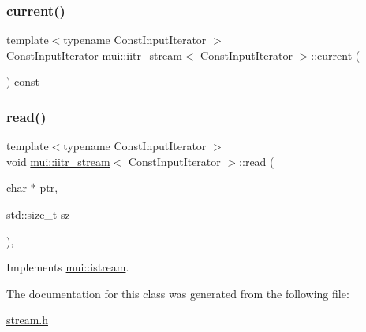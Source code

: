 \subsubsection{\texorpdfstring{current()}{current()}}
{\footnotesize\ttfamily template$<$typename Const\+Input\+Iterator $>$ \\
Const\+Input\+Iterator \hyperlink{classmui_1_1iitr__stream}{mui\+::iitr\+\_\+stream}$<$ Const\+Input\+Iterator $>$\+::current (\begin{DoxyParamCaption}{ }\end{DoxyParamCaption}) const\hspace{0.3cm}{\ttfamily [inline]}}

\mbox{\label{classmui_1_1iitr__stream_aa39fd880d0a4ec821775a86c0d7bc2ce}} 
\subsubsection{\texorpdfstring{read()}{read()}}
{\footnotesize\ttfamily template$<$typename Const\+Input\+Iterator $>$ \\
void \hyperlink{classmui_1_1iitr__stream}{mui\+::iitr\+\_\+stream}$<$ Const\+Input\+Iterator $>$\+::read (\begin{DoxyParamCaption}\item[{char $\ast$}]{ptr,  }\item[{std\+::size\+\_\+t}]{sz }\end{DoxyParamCaption})\hspace{0.3cm}{\ttfamily [inline]}, {\ttfamily [virtual]}}



Implements \hyperlink{classmui_1_1istream_a275ecbe530bf67df5978be288897ab45}{mui\+::istream}.



The documentation for this class was generated from the following file\+:\begin{DoxyCompactItemize}
\item 
\hyperlink{stream_8h}{stream.\+h}\end{DoxyCompactItemize}
